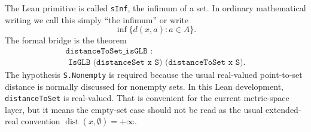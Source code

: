 \begin{remark*}
The Lean primitive is called \texttt{sInf}, the infimum of a set. In ordinary
mathematical writing we call this simply ``the infimum'' or write
\[
  \inf \{ d(x,a) : a \in A \}.
\]
The formal bridge is the theorem
\[
\begin{gathered}
  \texttt{distanceToSet\_isGLB :}\\
  \texttt{\ \ IsGLB (distanceSet x S) (distanceToSet x S).}
\end{gathered}
\]
The hypothesis \texttt{S.Nonempty} is required because the usual real-valued
point-to-set distance is normally discussed for nonempty sets. In this Lean
development, \texttt{distanceToSet} is real-valued. That is convenient for the
current metric-space layer, but it means the empty-set case should not be read
as the usual extended-real convention $\operatorname{dist}(x,\emptyset)=+\infty$.
\end{remark*}

